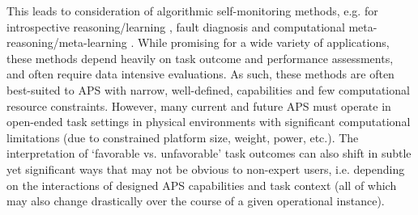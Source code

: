 This leads to consideration of algorithmic self-monitoring methods, e.g. for introspective reasoning/learning \cite{Huang2017-zt}, fault diagnosis and computational meta-reasoning/meta-learning \cite{grant2018recasting}. 
While promising for a wide variety of applications, these methods depend heavily on task outcome and performance assessments, and often require data intensive evaluations. 
As such, these methods are often best-suited to APS with narrow, well-defined, capabilities and few computational resource constraints. 
However, many current and future APS must operate in open-ended task settings in physical environments with significant computational limitations (due to constrained platform size, weight, power, etc.). 
The interpretation of `favorable vs. unfavorable' task outcomes can also shift in subtle yet significant ways that may not be obvious to non-expert users, i.e. depending on the interactions of designed APS capabilities and task context (all of which may also change drastically over the course of a given operational instance). 



